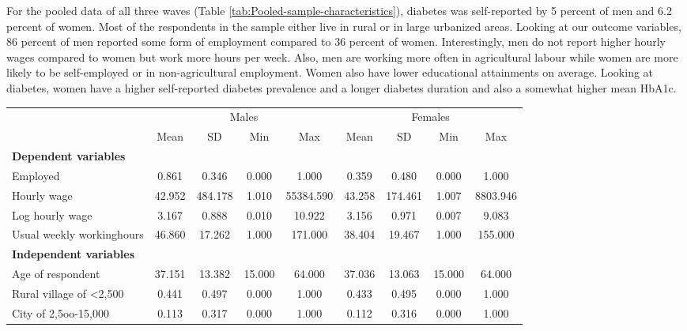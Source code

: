 For the pooled data of all three waves (Table \ref{tab:Pooled-sample-characteristics}),
diabetes was self-reported by 5 percent of men and 6.2 percent of
women. Most of the respondents in the sample either live in rural
or in large urbanized areas. Looking at our outcome variables, 86
percent of men reported some form of employment compared to 36 percent
of women. Interestingly, men do not report higher hourly wages compared
to women but work more hours per week. Also, men are working more
often in agricultural labour while women are more likely to be self-employed
or in non-agricultural employment. Women also have lower educational
attainments on average. Looking at diabetes, women have a higher self-reported
diabetes prevalence and a longer diabetes duration and also a somewhat
higher mean \ac{HbA1c}. 
\begin{table}[h!]
\begin{center}
{ \def\sym#1{\ifmmode^{#1}\else\(^{#1}\)\fi} \begin{tabular}{l*{2}{cccc}}
\toprule
                    &\multicolumn{4}{c}{Males}                          &\multicolumn{4}{c}{Females}                        \\
                    &        Mean&          SD&         Min&         Max&        Mean&          SD&         Min&         Max\\
\midrule
\textbf{Dependent variables} &&&&&&&& \\
Employed            &       0.861&       0.346&       0.000&       1.000&       0.359&       0.480&       0.000&       1.000\\
Hourly wage             &      42.952&     484.178&       1.010&   55384.590&      43.258&     174.461&       1.007&    8803.946\\
Log hourly wage     &       3.167&       0.888&       0.010&      10.922&       3.156&       0.971&       0.007&       9.083\\
Usual weekly workinghours&      46.860&      17.262&       1.000&     171.000&      38.404&      19.467&       1.000&     155.000\\
\textbf{Independent variables} &&&&&&&& \\
Age of respondent   &      37.151&      13.382&      15.000&      64.000&      37.036&      13.063&      15.000&      64.000\\
Rural village of <2,500&       0.441&       0.497&       0.000&       1.000&       0.433&       0.495&       0.000&       1.000\\
City of 2,5oo-15,000&       0.113&       0.317&       0.000&       1.000&       0.112&       0.316&       0.000&       1.000\\

\end{tabular}}
\end{center}
\end{table}
